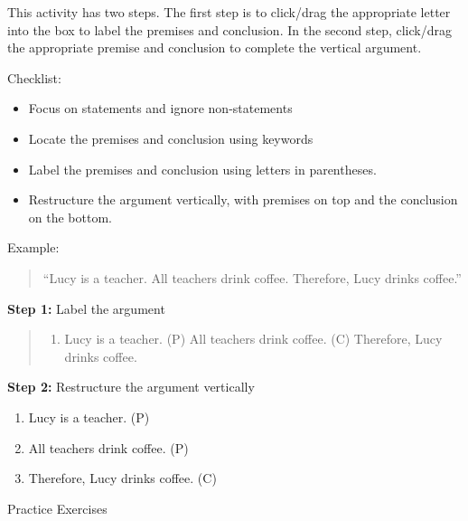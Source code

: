 \documentclass[
]{book}
\providecommand{\tightlist}{%
  \setlength{\itemsep}{0pt}\setlength{\parskip}{0pt}}
\begin{document}
\begin{reflect}
This activity has two steps. The first step is to click/drag the appropriate letter into the box to label the premises and conclusion. In the second step, click/drag the appropriate premise and conclusion to complete the vertical argument.

{Checklist:}

\begin{itemize}
\tightlist
\item
  Focus on statements and ignore non-statements\\
\item
  Locate the premises and conclusion using keywords\\
\item
  Label the premises and conclusion using letters in parentheses.\\
\item
  Restructure the argument vertically, with premises on top and the conclusion on the bottom.
\end{itemize}

{Example:}

\begin{quote}
``Lucy is a teacher. All teachers drink coffee. Therefore, Lucy drinks coffee.''
\end{quote}

\textbf{Step 1:} Label the argument

\begin{quote}
\begin{enumerate}
\def\labelenumi{(\Alph{enumi})}
\setcounter{enumi}{15}
\tightlist
\item
  Lucy is a teacher. (P) All teachers drink coffee. (C) Therefore, Lucy drinks coffee.
\end{enumerate}
\end{quote}

\textbf{Step 2:} Restructure the argument vertically

\begin{enumerate}
\def\labelenumi{\arabic{enumi}.}
\tightlist
\item
  Lucy is a teacher. (P)\\
\item
  All teachers drink coffee. (P)\\
\item
  Therefore, Lucy drinks coffee. (C)
\end{enumerate}

{Practice Exercises}
\end{reflect}
\end{document}
